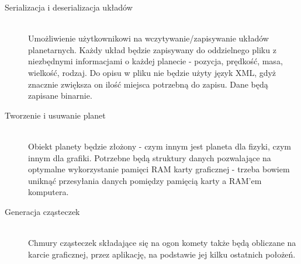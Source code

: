 \begin{description}
	\item[Serializacja i deserializacja układów] \hfill \\
	Umożliwienie użytkownikowi na wczytywanie/zapisywanie układów planetarnych. Każdy układ będzie zapisywany do oddzielnego pliku z niezbędnymi informacjami o każdej planecie - pozycja, prędkość, masa, wielkość, rodzaj. Do opisu w pliku nie będzie użyty język XML, gdyż znacznie zwiększa on ilość miejsca potrzebną do zapisu. Dane będą zapisane binarnie.
	\item[Tworzenie i usuwanie planet] \hfill \\
	Obiekt planety będzie złożony - czym innym jest planeta dla fizyki, czym innym dla grafiki. Potrzebne będą struktury danych pozwalające na optymalne wykorzystanie pamięci RAM karty graficznej - trzeba bowiem uniknąć przesyłania danych pomiędzy pamięcią karty a RAM'em komputera.
	\item[Generacja cząsteczek] \hfill \\
	Chmury cząsteczek składające się na ogon komety także będą obliczane na karcie graficznej, przez aplikację, na podstawie jej kilku ostatnich położeń.
\end{description}
